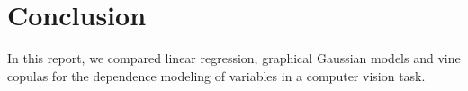 \documentclass{article}
\begin{document}
\section{Conclusion}
\label{sec:conclusion}


In this report, we compared linear regression, graphical Gaussian
models and vine copulas for the dependence modeling of variables in a
computer vision task. 

\printbibliography
\appendix

\end{document}
